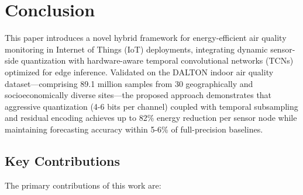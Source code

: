 \section{Conclusion}
\label{sec:conclusion}

This paper introduces a novel hybrid framework for energy-efficient air quality monitoring in Internet of Things (IoT) deployments, integrating dynamic sensor-side quantization with hardware-aware temporal convolutional networks (TCNs) optimized for edge inference. Validated on the DALTON indoor air quality dataset—comprising 89.1 million samples from 30 geographically and socioeconomically diverse sites—the proposed approach demonstrates that aggressive quantization (4-6 bits per channel) coupled with temporal subsampling and residual encoding achieves up to 82\% energy reduction per sensor node while maintaining forecasting accuracy within 5-6\% of full-precision baselines.

\subsection{Key Contributions}

The primary contributions of this work are:

